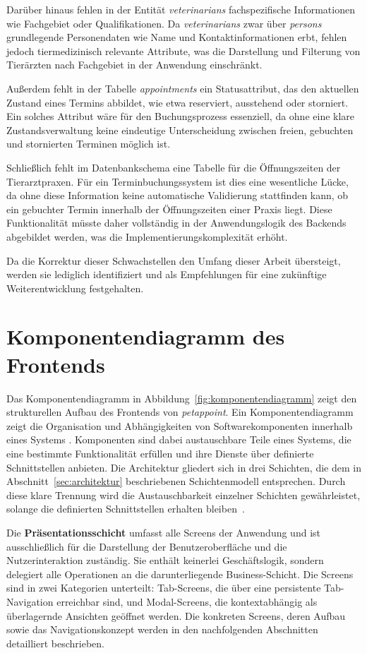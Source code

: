 Darüber hinaus fehlen in der Entität \textit{veterinarians} fachspezifische Informationen wie Fachgebiet oder Qualifikationen. Da \textit{veterinarians} zwar über \textit{persons} grundlegende Personendaten wie Name und Kontaktinformationen erbt, fehlen jedoch tiermedizinisch relevante Attribute, was die Darstellung und Filterung von Tierärzten nach Fachgebiet in der Anwendung einschränkt.

Außerdem fehlt in der Tabelle \textit{appointments} ein Statusattribut, das den aktuellen Zustand eines Termins abbildet, wie etwa reserviert, ausstehend oder storniert. Ein solches Attribut wäre für den Buchungsprozess essenziell, da ohne eine klare Zustandsverwaltung keine eindeutige Unterscheidung zwischen freien, gebuchten und stornierten Terminen möglich ist.

Schließlich fehlt im Datenbankschema eine Tabelle für die Öffnungszeiten der Tierarztpraxen. Für ein Terminbuchungssystem ist dies eine wesentliche Lücke, da ohne diese Information keine automatische Validierung stattfinden kann, ob ein gebuchter Termin innerhalb der Öffnungszeiten einer Praxis liegt. Diese Funktionalität müsste daher vollständig in der Anwendungslogik des 
Backends abgebildet werden, was die Implementierungskomplexität erhöht.

Da die Korrektur dieser Schwachstellen den Umfang dieser Arbeit übersteigt, werden sie lediglich identifiziert und als Empfehlungen für eine zukünftige Weiterentwicklung festgehalten.

\section{Komponentendiagramm des Frontends}

Das Komponentendiagramm in Abbildung~\ref{fig:komponentendiagramm} zeigt den strukturellen Aufbau des Frontends von \textit{petappoint}. Ein Komponentendiagramm zeigt die Organisation und Abhängigkeiten von Softwarekomponenten innerhalb eines Systems \cite[S.~19]{sparxsystems2026}. 
Komponenten sind dabei austauschbare Teile eines Systems, die eine bestimmte Funktionalität erfüllen und ihre Dienste über definierte Schnittstellen anbieten. Die Architektur gliedert sich in drei Schichten, die dem in Abschnitt~\ref{sec:architektur} 
beschriebenen Schichtenmodell entsprechen. Durch diese klare Trennung wird die Austauschbarkeit einzelner Schichten gewährleistet, solange die definierten Schnittstellen erhalten bleiben~\cite[S.~168]{sommerville2018}.

Die \textbf{Präsentationsschicht} umfasst alle Screens der Anwendung und ist ausschließlich für die Darstellung der Benutzeroberfläche und die Nutzerinteraktion zuständig. Sie enthält keinerlei Geschäftslogik, sondern delegiert alle Operationen an die darunterliegende Business-Schicht. Die Screens sind in zwei Kategorien unterteilt: Tab-Screens, die über eine persistente Tab-Navigation erreichbar sind, und Modal-Screens, die kontextabhängig als überlagernde Ansichten geöffnet werden. Die konkreten Screens, deren Aufbau sowie das Navigationskonzept werden in den 
nachfolgenden Abschnitten detailliert beschrieben.

